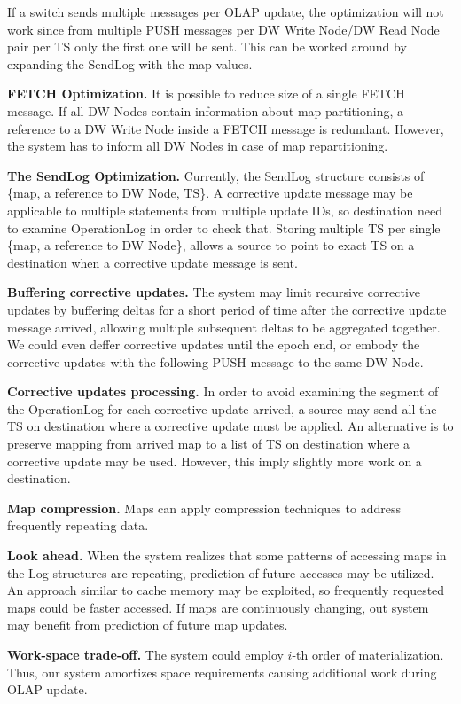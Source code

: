 \documentclass{sig-semester}
\def\OLAP{OLAP\xspace}
\begin{document}
If a switch sends multiple messages per \OLAP update, the optimization will not work since from multiple PUSH messages per DW Write Node/DW Read Node pair per TS only the first one will be sent. This can be worked around by expanding the SendLog with the map values. 

\textbf{FETCH Optimization.} It is possible to reduce size of a single FETCH message. If all DW Nodes contain information about map partitioning, a reference to a DW Write Node inside a FETCH message is redundant. However, the system has to inform all DW Nodes in case of map repartitioning.

\textbf{The SendLog Optimization.} Currently, the SendLog structure consists of \{map, a reference to DW Node, TS\}. A corrective update message may be applicable to multiple statements from multiple update IDs, so destination need to examine OperationLog in order to check that. Storing multiple TS per single \{map, a reference to DW Node\}, allows a source to point to exact TS on a destination when a corrective update message is sent.

\textbf{Buffering corrective updates.} The system may limit recursive corrective updates by buffering deltas for a short period of time after the corrective update message arrived, allowing multiple subsequent deltas to be aggregated together. We could even deffer corrective updates until the epoch end, or embody the corrective updates with the following PUSH message to the same DW Node.

\textbf{Corrective updates processing.} In order to avoid examining the segment of the OperationLog for each corrective update arrived, a source may send all the TS on destination where a corrective update must be applied. An alternative is to preserve mapping from arrived map to a list of TS on destination where a corrective update may be used. However, this imply slightly more work on a destination.

\textbf{Map compression.} Maps can apply compression techniques to address frequently repeating data.

\textbf{Look ahead.} When the system realizes that some patterns of accessing maps in the Log structures are repeating, prediction of future accesses may be utilized. An approach similar to cache memory may be exploited, so frequently requested maps could be faster accessed. If maps are continuously changing, out system may benefit from prediction of future map updates.

\textbf{Work-space trade-off. } The system could employ $i$-th order of materialization. Thus, our system amortizes space requirements causing additional work during \OLAP update.
\end{document}
